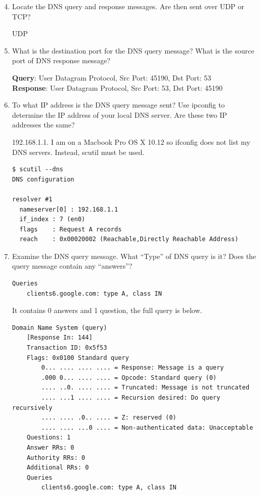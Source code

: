 \documentclass[letter,10pt]{article}
\begin{document}
\begin{enumerate}
\setcounter{enumi}{3}

\item Locate the DNS query and response messages. Are then sent over UDP or TCP?

UDP

\item What is the destination port for the DNS query message? What is the source port
of DNS response message?

\textbf{Query}: User Datagram Protocol, Src Port: 45190, Dst Port: 53 \\
\textbf{Response}: User Datagram Protocol, Src Port: 53, Dst Port: 45190

\item To what IP address is the DNS query message sent? Use ipconfig to determine the
IP address of your local DNS server. Are these two IP addresses the same?

192.168.1.1. I am on a Macbook Pro OS X 10.12 so ifconfig does not list my DNS servers. Instead, scutil must be used.

\begin{verbatim}
$ scutil --dns
DNS configuration

resolver #1
  nameserver[0] : 192.168.1.1
  if_index : 7 (en0)
  flags    : Request A records
  reach    : 0x00020002 (Reachable,Directly Reachable Address)
\end{verbatim}

\item Examine the DNS query message. What “Type” of DNS query is it? Does the
query message contain any “answers”?

\begin{verbatim}
Queries
    clients6.google.com: type A, class IN
\end{verbatim}

It contains 0 answers and 1 question,  the full query is below.

\begin{verbatim}
Domain Name System (query)
    [Response In: 144]
    Transaction ID: 0x5f53
    Flags: 0x0100 Standard query
        0... .... .... .... = Response: Message is a query
        .000 0... .... .... = Opcode: Standard query (0)
        .... ..0. .... .... = Truncated: Message is not truncated
        .... ...1 .... .... = Recursion desired: Do query recursively
        .... .... .0.. .... = Z: reserved (0)
        .... .... ...0 .... = Non-authenticated data: Unacceptable
    Questions: 1
    Answer RRs: 0
    Authority RRs: 0
    Additional RRs: 0
    Queries
        clients6.google.com: type A, class IN
\end{verbatim}


\end{enumerate}
\end{document}
